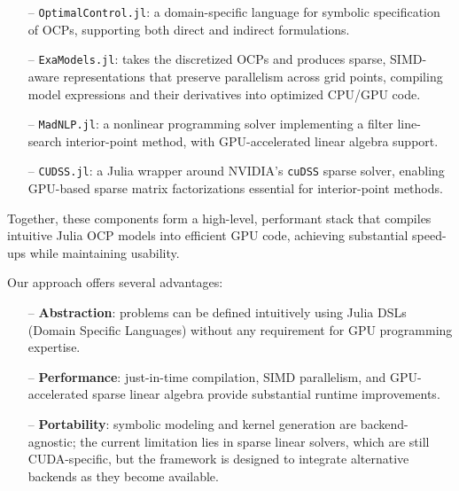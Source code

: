 \begin{itemize}
    \item[--] \texttt{OptimalControl.jl}: a domain-specific language for symbolic specification of OCPs, supporting both direct and indirect formulations.
    \item[--] \texttt{ExaModels.jl}: takes the discretized OCPs and produces sparse, SIMD-aware representations that preserve parallelism across grid points, compiling model expressions and their derivatives into optimized CPU/GPU code.
    \item[--] \texttt{MadNLP.jl}: a nonlinear programming solver implementing a filter line-search interior-point method, with GPU-accelerated linear algebra support.
    \item[--] \texttt{CUDSS.jl}: a Julia wrapper around NVIDIA’s \texttt{cuDSS} sparse solver, enabling GPU-based sparse matrix factorizations essential for interior-point methods.
\end{itemize}
\noindent Together, these components form a high-level, performant stack that compiles intuitive Julia OCP models into efficient GPU code, achieving substantial speed-ups while maintaining usability.

Our approach offers several advantages:
\begin{itemize}
    \item[--] \textbf{Abstraction}: problems can be defined intuitively using Julia DSLs (Domain Specific Languages) without any requirement for GPU programming expertise.
    \item[--] \textbf{Performance}: just-in-time compilation, SIMD parallelism, and GPU-accelerated sparse linear algebra provide substantial runtime improvements.
    \item[--] \textbf{Portability}: symbolic modeling and kernel generation are backend-agnostic; the current limitation lies in sparse linear solvers, which are still CUDA-specific, but the framework is designed to integrate alternative backends as they become available.
\end{itemize}

